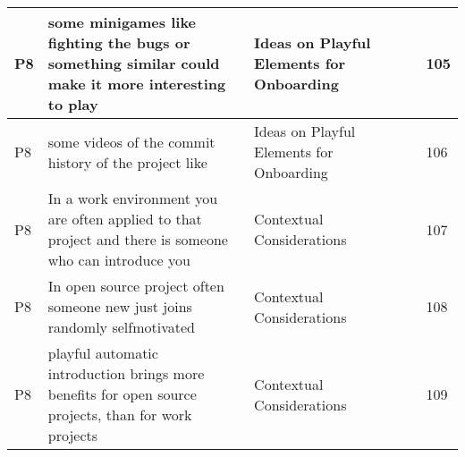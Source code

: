 \begin{appendices}
\begin{landscape}
\begin{longtable}{|p{0.8cm}|p{7cm}|p{3cm}|p{3cm}|p{5.5cm}|p{0.5cm}|}
      P8                   & some minigames like fighting the bugs or something similar could make it more interesting to play                                                                                                                                                                           & Ideas on Playful Elements for Onboarding &                                    &                                                                                                                                                    & 105          \\ \hline
      P8                   & some videos of the commit history of the project like                                                                                                                                                                                                                       & Ideas on Playful Elements for Onboarding &                                    &                                                                                                                                                    & 106          \\ \hline
      P8                   & In a work environment you are often applied to that project and there is someone who can introduce you                                                                                                                                                                      & Contextual Considerations                &                                    &                                                                                                                                                    & 107          \\ \hline
      P8                   & In open source project often someone new just joins randomly selfmotivated                                                                                                                                                                                                  & Contextual Considerations                &                                    &                                                                                                                                                    & 108          \\ \hline
      P8                   & playful automatic introduction brings more benefits for open source projects, than for work projects                                                                                                                                                                        & Contextual Considerations                &                                    &                                                                                                                                                    & 109          \\ \hline

\end{longtable}
\end{landscape}
\end{appendices}
